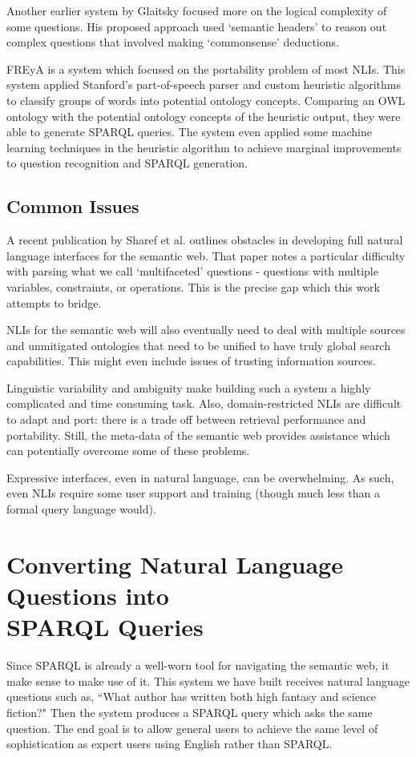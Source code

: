 \documentclass[11pt]{article}
\begin{document}
Another earlier system by Glaitsky\cite{galitsky2} focused more on the logical complexity
of some questions. His proposed approach used `semantic headers' to reason out
complex questions that involved making `commonsense' deductions.

FREyA\cite{freya} is a system which focused on the portability problem of most
NLIs. This system applied Stanford's part-of-speech parser and custom heuristic algorithms
to classify groups of words into potential ontology concepts. Comparing an OWL ontology
with the potential ontology concepts of the heuristic output, they were able to generate
SPARQL queries. The system even applied some machine learning techniques in the 
heuristic algorithm to achieve marginal improvements to question recognition and SPARQL
generation. 

\subsection{Common Issues}
A recent publication by Sharef et al. \cite{issues} outlines obstacles in developing full
natural language interfaces for the semantic web. That paper notes a particular
difficulty with parsing what we call `multifaceted' questions - questions with multiple
variables, constraints, or operations. This is the precise gap which this work
attempts to bridge.

NLIs for the semantic web will also eventually need to deal with multiple sources
and unmitigated ontologies that need to be unified to have truly global search
capabilities\cite{issues}. This might even include issues of trusting information
sources\cite{semantic}.

Linguistic variability and ambiguity make building such a
system a highly complicated and time consuming task. Also,
domain-restricted NLIs are difficult to adapt and port:
there is a trade off between retrieval performance and portability. 
Still, the meta-data of the semantic web provides assistance
which can potentially overcome some of these problems. \cite{usability}

Expressive interfaces, even in natural language, can be overwhelming.
As such, even NLIs require some user support and training (though much less than
a formal query language would). \cite{usability}

\section{Converting Natural Language Questions into \\SPARQL Queries}
Since SPARQL is already a well-worn tool for navigating the semantic
web, it make sense to make use of it. This system we have built receives natural language
questions such as, ``What author has written both high fantasy and science fiction?"
Then the system produces a SPARQL query which asks the same question. 
The end goal is to allow general users to achieve the same level of sophistication
as expert users using English rather than SPARQL.
\end{document}
